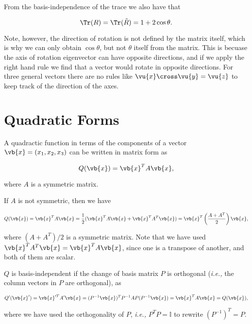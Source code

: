 \documentclass[a4paper,12pt]{report}
\begin{document}
From the basis-independence of the trace we also have that 

\begin{equation}
    \Tr (R) = \Tr (\tilde{R}) = 1+2 \cos \theta . 
\end{equation}

Note, however, the direction of rotation is not defined by the matrix itself, which is why we can only obtain \(\cos \theta \), but not \(\theta \) itself from the matrix. This is becuase the axis of rotation eigenvector can have opposite directions, and if we apply the right hand rule we find that a vector would rotate in opposite directions. For three general vectors there are no rules like \(\vu{x} \cross \vu{y} = \vu{z} \) to keep track of the direction of the axes.    

\section{Quadratic Forms}

A quadractic function in terms of the components of a vector \(\vb{x} = (x_1 ,x_2 ,x_3 )\) can be written in matrix form as 

\begin{equation}
    Q(\vb{x} ) = \vb{x} ^T A\vb{x} ,
\end{equation}

where \(A\) is a symmetric matrix.

If \(A\) is not symmetric, then we have

\begin{equation}
    Q(\vb{x} ) = \vb{x} ^T A \vb{x} = \frac{1}{2} (\vb{x} ^TA\vb{x} + \vb{x} ^TA^T\vb{x} ) = \vb{x} ^T\left( \frac{A+A^T}{2}  \right)\vb{x},
\end{equation}

where \((A+A^T) /2\) is a symmetric matrix. Note that we have used \(\vb{x} ^T A^T\vb{x} = \vb{x} ^T A \vb{x} \), since one is a transpose of another, and both of them are scalar.  

\(Q\) is basis-independent if the change of basis matrix \(P\) is orthogonal (\textit{i.e.,} the column vectors in \(P\) are orthogonal), as 

\begin{equation}
    Q'(\vb{x} ') = \vb{x} '^TA'\vb{x} = (P^{-1} \vb{x} )^TP^{-1} AP(P^{-1} \vb{x} ) = \vb{x} ^TA\vb{x} = Q(\vb{x} ),
\end{equation}

where we have used the orthogonality of \(P\), \textit{i.e.,} \(P^TP = \mathbb{I}\) to rewrite \((P^{-1} )^T = P\).
\end{document}
